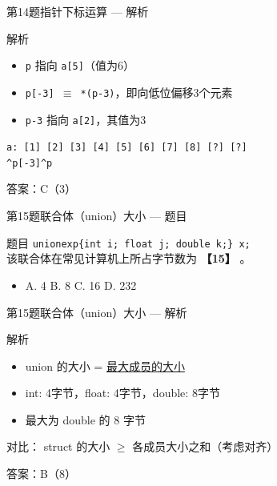 \begin{frame}{第14题}{指针下标运算 --- 解析}
    \begin{alertblock}{解析}
        \footnotesize
        \begin{itemize}
            \setlength{\itemsep}{0pt}
            \item \texttt{p} 指向 \texttt{a[5]}（值为6）
            \item \texttt{p[-3] $\equiv$ *(p-3)}，即向低位偏移3个元素
            \item \texttt{p-3} 指向 \texttt{a[2]}，其值为3
        \end{itemize}
        \begin{center}
            \texttt{a: [1] [2] [3] [4] [5] [6] [7] [8] [?] [?]}\\
            \texttt{\phantom{a: [1] [2] }\^{}p[-3]\phantom{ [4] [5] }\^{}p}
        \end{center}
        {\color{highlight}答案：C（3）}
    \end{alertblock}
\end{frame}

\begin{frame}{第15题}{联合体（union）大小 --- 题目}
    \begin{exampleblock}{题目}
        \texttt{unionexp\{int i; float j; double k;\} x;}\\
        该联合体在常见计算机上所占字节数为 \textbf{【15】} 。
        \begin{itemize}
            \setlength{\itemsep}{0pt}
            \item A. 4 \quad B. 8 \quad C. 16 \quad D. 232
        \end{itemize}
    \end{exampleblock}
\end{frame}

\begin{frame}{第15题}{联合体（union）大小 --- 解析}
    \begin{alertblock}{解析}
        \small
        \begin{itemize}
            \setlength{\itemsep}{0pt}
            \item union 的大小 = \underline{最大成员的大小}
            \item int: 4字节，float: 4字节，double: 8字节
            \item 最大为 double 的 8 字节
        \end{itemize}
        \vspace{0.3em}
        {\color{highlight}对比：} struct 的大小 $\geq$ 各成员大小之和（考虑对齐）

        \vspace{0.3em}
        {\color{highlight}答案：B（8）}
    \end{alertblock}
\end{frame}

